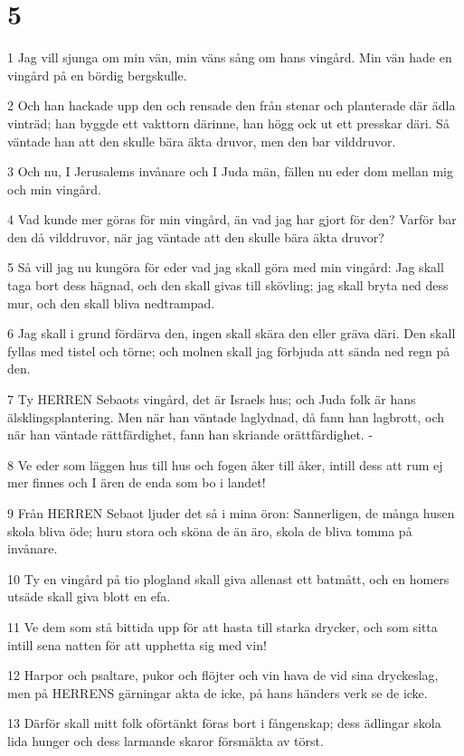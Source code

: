 \chapter{5}

\par 1 Jag vill sjunga om min vän, min väns sång om hans vingård. Min vän hade en vingård på en bördig bergskulle.
\par 2 Och han hackade upp den och rensade den från stenar och planterade där ädla vinträd; han byggde ett vakttorn därinne, han högg ock ut ett presskar däri. Så väntade han att den skulle bära äkta druvor, men den bar vilddruvor.
\par 3 Och nu, I Jerusalems invånare och I Juda män, fällen nu eder dom mellan mig och min vingård.
\par 4 Vad kunde mer göras för min vingård, än vad jag har gjort för den? Varför bar den då vilddruvor, när jag väntade att den skulle bära äkta druvor?
\par 5 Så vill jag nu kungöra för eder vad jag skall göra med min vingård: Jag skall taga bort dess hägnad, och den skall givas till skövling; jag skall bryta ned dess mur, och den skall bliva nedtrampad.
\par 6 Jag skall i grund fördärva den, ingen skall skära den eller gräva däri. Den skall fyllas med tistel och törne; och molnen skall jag förbjuda att sända ned regn på den.
\par 7 Ty HERREN Sebaots vingård, det är Israels hus; och Juda folk är hans älsklingsplantering. Men när han väntade laglydnad, då fann han lagbrott, och när han väntade rättfärdighet, fann han skriande orättfärdighet. -
\par 8 Ve eder som läggen hus till hus och fogen åker till åker, intill dess att rum ej mer finnes och I ären de enda som bo i landet!
\par 9 Från HERREN Sebaot ljuder det så i mina öron: Sannerligen, de många husen skola bliva öde; huru stora och sköna de än äro, skola de bliva tomma på invånare.
\par 10 Ty en vingård på tio plogland skall giva allenast ett batmått, och en homers utsäde skall giva blott en efa.
\par 11 Ve dem som stå bittida upp för att hasta till starka drycker, och som sitta intill sena natten för att upphetta sig med vin!
\par 12 Harpor och psaltare, pukor och flöjter och vin hava de vid sina dryckeslag, men på HERRENS gärningar akta de icke, på hans händers verk se de icke.
\par 13 Därför skall mitt folk oförtänkt föras bort i fångenskap; dess ädlingar skola lida hunger och dess larmande skaror försmäkta av törst.
